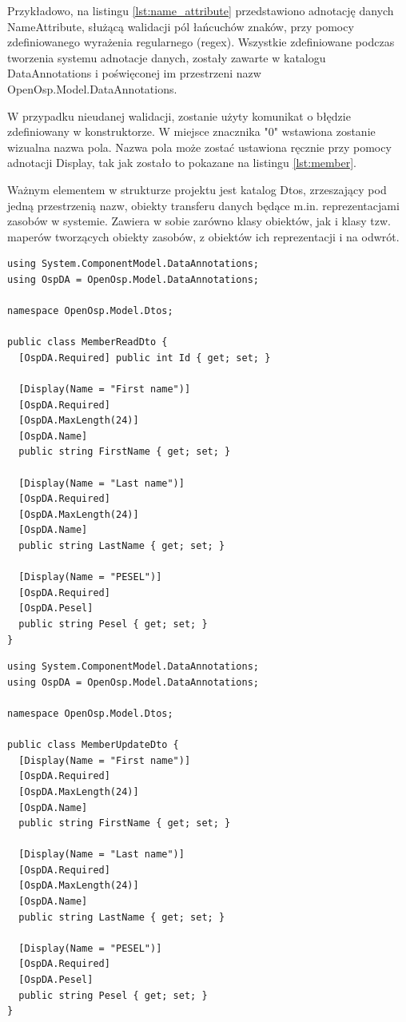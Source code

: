 Przykładowo, na listingu \ref{lst:name_attribute} przedstawiono adnotację danych NameAttribute, służącą walidacji pól łańcuchów znaków, przy pomocy zdefiniowanego wyrażenia regularnego (regex). Wszystkie zdefiniowane podczas tworzenia systemu adnotacje danych, zostały zawarte w katalogu DataAnnotations i poświęconej im przestrzeni nazw OpenOsp.Model.DataAnnotations. 

W przypadku nieudanej walidacji, zostanie użyty komunikat o błędzie zdefiniowany w konstruktorze. W miejsce znacznika "{0}" wstawiona zostanie wizualna nazwa pola. Nazwa pola może zostać ustawiona ręcznie przy pomocy adnotacji Display, tak jak zostało to pokazane na listingu \ref{lst:member}.

Ważnym elementem w strukturze projektu jest katalog Dtos, zrzeszający pod jedną przestrzenią nazw, obiekty transferu danych będące m.in. reprezentacjami zasobów w systemie. Zawiera w sobie zarówno klasy obiektów, jak i klasy tzw. maperów tworzących obiekty zasobów, z obiektów ich reprezentacji i na odwrót.

\begin{lstlisting}[language=CSharp, caption={Przykładowa klasa obiektu transferu danych, stanowiąca reprezentację odczytu zasobu}, label=lst:member_read_dto]
using System.ComponentModel.DataAnnotations;
using OspDA = OpenOsp.Model.DataAnnotations;

namespace OpenOsp.Model.Dtos; 

public class MemberReadDto {
  [OspDA.Required] public int Id { get; set; }

  [Display(Name = "First name")]
  [OspDA.Required]
  [OspDA.MaxLength(24)]
  [OspDA.Name]
  public string FirstName { get; set; }

  [Display(Name = "Last name")]
  [OspDA.Required]
  [OspDA.MaxLength(24)]
  [OspDA.Name]
  public string LastName { get; set; }

  [Display(Name = "PESEL")]
  [OspDA.Required]
  [OspDA.Pesel]
  public string Pesel { get; set; }
}
\end{lstlisting}

\begin{lstlisting}[language=CSharp, caption={Przykładowa klasa obiektu transferu danych, stanowiąca reprezentację aktualizacji zasobu}, label=lst:member_update_dto]
using System.ComponentModel.DataAnnotations;
using OspDA = OpenOsp.Model.DataAnnotations;

namespace OpenOsp.Model.Dtos; 

public class MemberUpdateDto {
  [Display(Name = "First name")]
  [OspDA.Required]
  [OspDA.MaxLength(24)]
  [OspDA.Name]
  public string FirstName { get; set; }

  [Display(Name = "Last name")]
  [OspDA.Required]
  [OspDA.MaxLength(24)]
  [OspDA.Name]
  public string LastName { get; set; }

  [Display(Name = "PESEL")]
  [OspDA.Required]
  [OspDA.Pesel]
  public string Pesel { get; set; }
}
\end{lstlisting}

